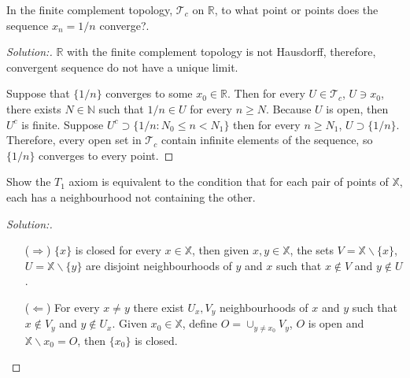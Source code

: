 \documentclass[a4paper,12pt, reqno]{article}
\theoremstyle{definition}
\newenvironment{exerr}[1]{
  \renewcommand\theexeralt{#1}
  \exeralt
}{\endexeralt}
\newenvironment{solution}{\begin{proof}[Solution:]}{\end{proof}}
\newcommand{\R}{\mathbb{R}}
\newcommand{\T}{\mathscr{T}}
\newcommand{\N}{\mathbb{N}}
\newcommand{\X}{\mathbb{X}}
\begin{document}
\begin{exerr}{14}
  In the finite complement topology, $\T_{c}$ on $\R$, to what point or points does the sequence $x_{n}=1/n$ converge?.
\end{exerr}
\begin{solution}
  $\R$ with the finite complement topology is not Hausdorff, therefore, convergent sequence do not have a unique limit.

  Suppose that $\{ 1/n \}$ converges to some $x_{0}\in\R$. Then for every $U\in \T_{c}$, $U\ni x_{0}$, there exists $N\in\N$ such that $1/n\in U$ for every $n\geq N$. Because $U$ is open, then $U^c$ is finite. Suppose $U^c\supset\{ 1/n : N_{0}\leq n< N_{1} \}$ then for every $n\geq N_{1}$, $U\supset\{ 1/n \}$. Therefore, every open set in $\T_{c}$ contain infinite elements of the sequence, so $\{ 1/n \}$ converges to every point.
\end{solution}

\begin{exerr}{15}
  Show the $T_{1}$ axiom is equivalent to the condition that for each pair of points of $\X$, each has a neighbourhood not containing the other.
\end{exerr}
\begin{solution}\hfill
  \begin{itemize}
    \item[($\Longrightarrow$)] $\{ x \}$ is closed for every $x\in\X$, then given $x,y\in\X$, the sets $V = \X\backslash\{ x \}$, $U = \X\backslash\{ y \}$ are disjoint neighbourhoods of $y$ and $x$ such that $x\notin V$ and $y\notin U$.
    \item[($\Longleftarrow$)] For every $x\neq y$ there exist $U_{x},V_{y}$ neighbourhoods of $x$ and $y$ such that $x\notin V_{y}$ and $y\notin U_{x}$. Given $x_{0}\in\X$, define $O = \cup_{y\neq x_{0}}V_{y}$, $O$ is open and $\X\backslash{x_{0}} = O$, then $\{ x_{0} \}$ is closed.
  \end{itemize}
\end{solution}
\end{document}
